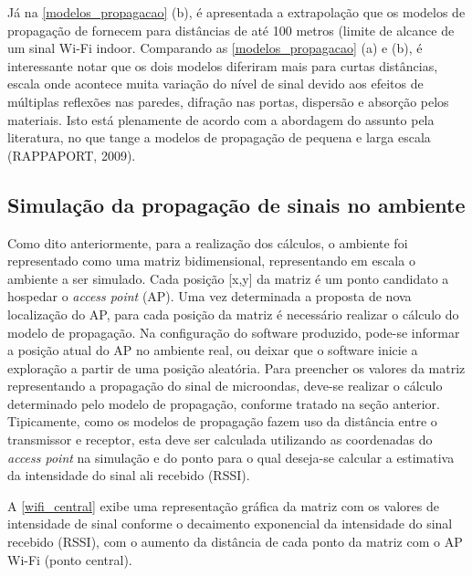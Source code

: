 \documentclass[
	12pt,				%
	openright,			%
	twoside,			%
	a4paper,			%
	english,			%
	french,				%
	spanish,			%
	brazil				%
	]{abntex2}
\begin{document}
Já na \autoref{modelos_propagacao} (b), é apresentada a extrapolação que os modelos de propagação de fornecem para distâncias de até 100 metros (limite de alcance de um sinal Wi-Fi indoor. Comparando as \autoref{modelos_propagacao} (a) e (b), é interessante notar que os dois modelos diferiram mais para curtas distâncias, escala onde acontece muita variação do nível de sinal devido aos efeitos de múltiplas reflexões nas paredes, difração nas portas, dispersão e absorção pelos materiais. Isto está plenamente de acordo com a abordagem do assunto pela literatura, no que tange a modelos de propagação de pequena e larga escala (RAPPAPORT, 2009). 

\clearpage

\subsection[Simulação da propagação de sinais no ambiente]{Simulação da propagação de sinais no ambiente}

Como dito anteriormente, para a realização dos cálculos, o ambiente foi representado como uma matriz bidimensional, representando em escala o ambiente a ser simulado. Cada posição [x,y] da matriz é um ponto candidato a hospedar o \textit{access point} (AP). Uma vez determinada a proposta de nova localização do AP, para cada posição da matriz é necessário realizar o cálculo do modelo de propagação. Na configuração do software produzido, pode-se informar a posição atual do AP no ambiente real, ou deixar que o software inicie a exploração a partir de uma posição aleatória. Para preencher os valores da matriz representando a propagação do sinal de microondas, deve-se realizar o cálculo determinado pelo modelo de propagação, conforme tratado na seção anterior. Tipicamente, como os modelos de propagação fazem uso da distância entre o transmissor e receptor, esta deve ser calculada utilizando as coordenadas do \textit{access point} na simulação e do ponto para o qual deseja-se calcular a estimativa da intensidade do sinal ali recebido (RSSI).

A \autoref{wifi_central} exibe uma representação gráfica da matriz com os valores de intensidade de sinal conforme o decaimento exponencial da intensidade do sinal recebido (RSSI), com o aumento da distância de cada ponto da matriz com o AP Wi-Fi (ponto central).
\end{document}
